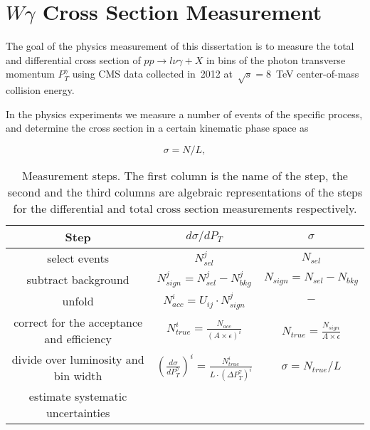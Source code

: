 \chapter{$W\gamma$ Cross Section Measurement}
\label{sec:AN_WgMeas}

The goal of the physics measurement of this dissertation is to measure the total and differential cross section of $pp \rightarrow l\nu\gamma + X$ in bins of the photon transverse momentum $P_T^\gamma$ using CMS data collected in~2012 at~$\sqrt{s}=8$~TeV center-of-mass collision energy. 

In the physics experiments we measure a number of events of the specific process, and determine the cross section in a certain kinematic phase space as

\begin{equation}
  \sigma = N/L,
\end{equation}

\begin{table}[h]
  \small
  \begin{center}
  \caption{Measurement steps. The first column is the name of the step, the second and the third columns are algebraic representations of the steps for the differential and total cross section measurements respectively. }
  \begin{tabular}{|c|c|c|}
    \hline
    Step & $d\sigma/dP_{T}$ & $\sigma$ \\ \hline
    select events & $N_{sel}^j$ &    $N_{sel}$       \\ \hline
    subtract background & $N_{sign}^j = N_{sel}^j - N_{bkg}^j$ &    $N_{sign}=N_{sel}-N_{bkg}$       \\ \hline
    unfold   & $N_{acc}^i = U_{ij} \cdot N_{sign}^j$ &    $-$       \\ \hline
    correct for the acceptance and efficiency & $N_{true}^i = \frac{N_{acc}}{(A \times\epsilon)^i}$ &  $N_{true}=\frac{N_{sign}}{A\times\epsilon}$       \\ \hline
    divide over luminosity and bin width & $ \left( \frac{d\sigma}{dP_{T}^\gamma} \right) ^i = \frac{N_{true}^i}{L \cdot (\Delta P_T^\gamma)^i}$  &  $\sigma = N_{true}/L$       \\ \hline
    estimate systematic uncertainties &  &         \\ \hline
  \end{tabular}
  \label{tab:analysisOutline}
  \end{center}
\end{table}

